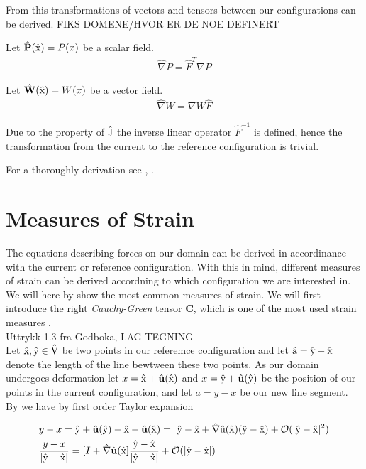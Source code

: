 From this transformations of vectors and tensors between our configurations can be derived. 
FIKS DOMENE/HVOR ER DE NOE DEFINERT
\begin{defn}
Let $\hat{P} (\ha{x}) = P (x)$  be a scalar  field. 
\begin{align}
\hat{\nabla}P = \hat{F}^{T} \nabla P
\end{align} 
\end{defn}

\begin{defn}
Let $\hat{W} (\ha{x}) = W (x)$  be a vector  field. 
\begin{align}
\hat{\nabla}W = \nabla W \hat{F} 
\end{align} 
\end{defn}

Due to the property of $\text{\^{J}}$ the inverse linear operator $\hat{F}^{-1}$ is defined, hence the transformation from the current to the reference configuration is trivial.

For a thoroughly derivation see \cite{Wriggers2006}, \cite{Richter2016}.



\section{Measures of Strain}
The equations describing forces on our domain can be derived in accordinance with the current or
reference configuration. With this in mind, different measures of strain can be derived accordning to which configuration we are 
interested in. We will here by \cite{Richter2016} show the most common measures of strain. We will first introduce the right \textit{Cauchy-Green} tensor \textbf{C}, which is one of the most used strain measures \cite{Wriggers2006}. \\ Uttrykk 1.3 fra Godboka, LAG TEGNING \\ 

Let $\text{\^{x}}, \text{\^{y}} \in \text{\^{V}}$ be two points in our referemce configuration and let $\text{\^{a}} = \text{\^{y}} - \text{\^{x}}$ denote the
length of the line bewtween these two points. As our domain undergoes deformation let 
$x = \ha{x} + \hat{u}( \ha{x} ) $ and $x = \ha{y} + \hat{u}( \ha{y} )  $ be the position of our points in the current configuration, and let $a = y - x$ be our new line segment. By \cite{Richter2016} we have by first order Taylor expansion

\begin{align*}
&y - x = \ha{y} + \hat{u}(\ha{y}) - \ha{x} - \hat{u}(\ha{x}) = \
\ha{y} - \ha{x} + \hat{\nabla}\ha{u}(\ha{x}) (\ha{y} - \ha{x}) 
+ \mathcal{O}(|\ha{y} - \ha{x} |^2) \\
&\frac{y - x}{|\ha{y} - \ha{x}|} = [I + \hat{\nabla}\hat{u}(\ha{x} ]  
\frac{\ha{y} - \ha{x}}{|\ha{y} - \ha{x}|} + \mathcal{O}(|\ha{y} - \ha{x} |) 
\end{align*}

